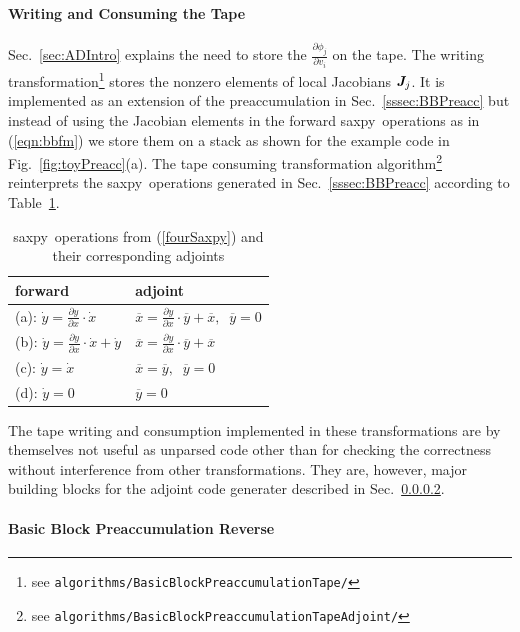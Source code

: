 \documentclass[11pt]{article}
\newcommand{\saxpy}{saxpy}
\newcommand{\bmJ}{\mbox{\bf\em J}}
\newcommand{\refsec}[1]{{Sec.~\ref{#1}}}
\newcommand{\reffig}[1]{{Fig.~\ref{#1}}}
\newcommand{\reftab}[1]{{Table~\ref{#1}}}
\newcommand{\refeqn}[1]{{(\ref{#1})}}
\begin{document}
\paragraph{Writing and Consuming the Tape}\label{sssec:bbTA}

\refsec{sec:ADIntro} explains the need to store the $\frac{\partial \phi_j}{\partial v_i}$ 
on the tape. 
The writing transformation\footnote{
see {\tt algorithms/BasicBlockPreaccumulationTape/}
}
stores the nonzero elements of local
Jacobians $\bmJ_j$. It is implemented as an extension of the 
preaccumulation in \refsec{sssec:BBPreacc} but instead of using the Jacobian elements 
in the forward 
\saxpy\ operations as in \refeqn{eqn:bbfm} we store them 
on a stack as shown for the example code in \reffig{fig:toyPreacc}(a). 
The tape consuming transformation algorithm\footnote{ 
see {\tt algorithms/BasicBlockPreaccumulationTapeAdjoint/}
} 
reinterprets
the \saxpy\ operations generated in \refsec{sssec:BBPreacc} 
according to \reftab{tab:saxpyAdj}.
\begin{table}
\begin{center}
  \begin{tabular}{l|l}
forward & adjoint\\\hline
    (a): $\dot{y} = \frac{\partial y }{\partial x }\cdot \dot{x}$           & $\overline{x} = \frac{\partial y }{\partial x }\cdot \overline{y} + \overline{x},\;\;\overline{y}=0$ \\
    (b): $\dot{y} = \frac{\partial y }{\partial x }\cdot \dot{x} + \dot{y}$ & $\overline{x} = \frac{\partial y }{\partial x }\cdot \overline{y} + \overline{x}$ \\
    (c): $\dot{y} = \dot{x}$ 					            & $\overline{x} = \overline{y},\;\;\overline{y}=0$\\
    (d): $\dot{y} = 0$ 						            & $\overline{y} = 0$ 
  \end{tabular}
\end{center}
  \caption{\saxpy\ operations  from \refeqn{fourSaxpy} and their corresponding adjoints} \label{tab:saxpyAdj}
\end{table} 
The tape writing and consumption implemented in these transformations are 
by themselves not useful as unparsed code other than for checking the correctness without 
interference from other transformations. 
They are, however, major building blocks for the  
adjoint code generater described in \refsec{sssec:BBRev}.
\paragraph{Basic Block Preaccumulation Reverse}\label{sssec:BBRev}
\end{document}
